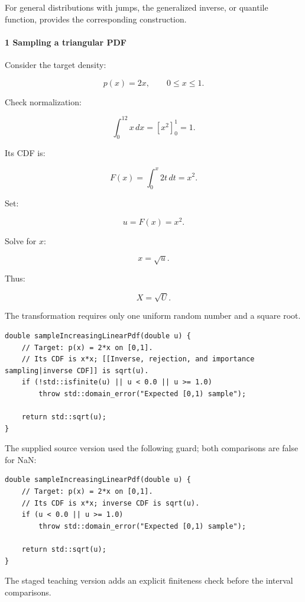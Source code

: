 For general distributions with jumps, the generalized inverse, or quantile function, provides the corresponding construction.

\paragraph{1 Sampling a triangular PDF}\label{02-foundations-ii-ch029-sampling-a-triangular-pdf}

\hypertarget{02-foundations-ii-ch029-sampling-a-triangular-pdf}{}

Consider the target density:

\[
 p(x)=2x,\qquad0\le x\le1.
\]

Check normalization:

\[
 \int_0^12x\,dx = [x^2]_0^1=1.
\]

Its CDF is:

\[
 F(x)=\int_0^x2t\,dt=x^2.
\]

Set:

\[
 u=F(x)=x^2.
\]

Solve for \(x\):

\[
 \boxed{x=\sqrt u}.
\]

Thus:

\[
 \boxed{X=\sqrt U}.
\]

The transformation requires only one uniform random number and a square root.

\begin{verbatim}
double sampleIncreasingLinearPdf(double u) {
    // Target: p(x) = 2*x on [0,1].
    // Its CDF is x*x; [[Inverse, rejection, and importance sampling|inverse CDF]] is sqrt(u).
    if (!std::isfinite(u) || u < 0.0 || u >= 1.0)
        throw std::domain_error("Expected [0,1) sample");

    return std::sqrt(u);
}
\end{verbatim}

The supplied source version used the following guard; both comparisons are false for NaN:

\begin{verbatim}
double sampleIncreasingLinearPdf(double u) {
    // Target: p(x) = 2*x on [0,1].
    // Its CDF is x*x; inverse CDF is sqrt(u).
    if (u < 0.0 || u >= 1.0)
        throw std::domain_error("Expected [0,1) sample");

    return std::sqrt(u);
}
\end{verbatim}

The staged teaching version adds an explicit finiteness check before the interval comparisons.

